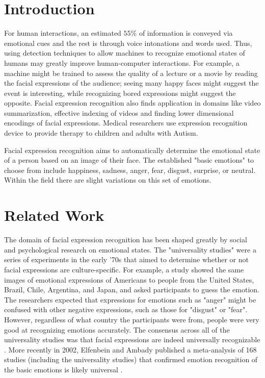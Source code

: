 \documentclass[10pt,twocolumn,letterpaper]{article}
\begin{document}
\section{Introduction}
For human interactions, an estimated $55\%$ of information is conveyed via emotional cues and the rest is through voice intonations and words used. Thus, using detection techniques to allow machines to recognize emotional states of humans may greatly improve human-computer interactions. For example, a machine might be trained to assess the quality of a lecture or a movie by reading the facial expressions of the audience; seeing many happy faces might suggest the event is interesting, while recognizing bored expressions might suggest the opposite. Facial expression recognition also finds application in domains like video summarization, effective indexing of videos and finding lower dimensional encodings of facial expressions\cite{why_detect}. Medical researchers use expression recognition device to provide therapy to children and adults with Autism.  

Facial expression recognition aims to automatically determine the emotional state of a person based on an image of their face. The established "basic emotions" to choose from include happiness, sadness, anger, fear, disgust, surprise, or neutral. Within the field there are slight variations on this set of emotions. 

\section{Related Work} 
The domain of facial expression recognition has been shaped greatly by social and psychological research on emotional states. The "universality studies" were a series of experiments in the early '70s that aimed to determine whether or not facial expressions are culture-specific. For example, a study showed the same images of emotional expressions of Americans to people from the United States, Brazil, Chile, Argentina, and Japan, and asked participants to guess the emotion. The researchers expected that expressions for emotions such as "anger" might be confused with other negative expressions, such as those for "disgust" or "fear". However, regardless of what country the participants were from, people were very good at recognizing emotions accurately. The consensus across all of the universality studies was that facial expressions are indeed universally recognizable \cite{universality_studies}. More recently in 2002, Elfenbein and Ambady published a meta-analysis of 168 studies (including the universality studies) that confirmed emotion recognition of the basic emotions is likely universal \cite{universality}.
\end{document}
